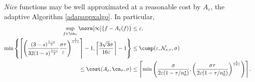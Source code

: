 \begin{theorem} \label{adapappxthm}  \emph{Nice} functions may be well approximated at a reasonable cost by $A_{\varepsilon}$, the adaptive Algorithm \ref{adapappxalgo}.  In particular,
\begin{align*}
\sup_{f \in \cn_{\tau}} \norm[\infty]{f - A_{\varepsilon}(f)} & \le \varepsilon, \\
\min\left\{\left\lceil  \left(\frac{(3-s)^{\frac{1-s}{2}}}{32(1-s)^{\frac{1-s}{2}}}\frac{\sigma\tau}{\varepsilon}\right)^{\frac{1}{1+s}}  \right\rceil-1, \left\lceil \frac{3\sqrt{3}\sigma}{16\varepsilon}\right\rceil-1 \right\} & \leq \comp(\varepsilon,\mathcal{N}_{s,\tau},\sigma)  \\
\le \cost(A_{\varepsilon},\cn_{\tau},\sigma) & \le  \left\lceil \min\left( \frac{\sigma}{2\varepsilon(1 - \tau/n_{0}^{s})} , \left(\frac{\sigma\tau}{2\varepsilon(1 - \tau/n_{0}^{s})}\right)^{\frac{1}{1+s}}\right) \right\rceil.
\end{align*}
\end{theorem}

